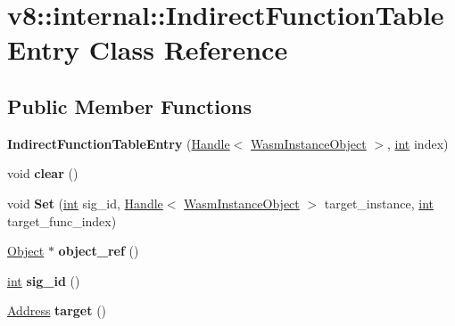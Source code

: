 \hypertarget{classv8_1_1internal_1_1IndirectFunctionTableEntry}{}\section{v8\+:\+:internal\+:\+:Indirect\+Function\+Table\+Entry Class Reference}
\label{classv8_1_1internal_1_1IndirectFunctionTableEntry}
\subsection*{Public Member Functions}
\begin{DoxyCompactItemize}
\item 
\mbox{\label{classv8_1_1internal_1_1IndirectFunctionTableEntry_aa31d066eb3cbeab5a5643d46a732711d}} 
{\bfseries Indirect\+Function\+Table\+Entry} (\mbox{\hyperlink{classv8_1_1internal_1_1Handle}{Handle}}$<$ \mbox{\hyperlink{classv8_1_1internal_1_1WasmInstanceObject}{Wasm\+Instance\+Object}} $>$, \mbox{\hyperlink{classint}{int}} index)
\item 
\mbox{\label{classv8_1_1internal_1_1IndirectFunctionTableEntry_a6b001921a06726cba7247d927be95c5b}} 
void {\bfseries clear} ()
\item 
\mbox{\label{classv8_1_1internal_1_1IndirectFunctionTableEntry_a9228066d6dac8c1a60000123a5586e0d}} 
void {\bfseries Set} (\mbox{\hyperlink{classint}{int}} sig\+\_\+id, \mbox{\hyperlink{classv8_1_1internal_1_1Handle}{Handle}}$<$ \mbox{\hyperlink{classv8_1_1internal_1_1WasmInstanceObject}{Wasm\+Instance\+Object}} $>$ target\+\_\+instance, \mbox{\hyperlink{classint}{int}} target\+\_\+func\+\_\+index)
\item 
\mbox{\label{classv8_1_1internal_1_1IndirectFunctionTableEntry_a686b397dae263368c95b2f990e7af810}} 
\mbox{\hyperlink{classv8_1_1internal_1_1Object}{Object}} $\ast$ {\bfseries object\+\_\+ref} ()
\item 
\mbox{\label{classv8_1_1internal_1_1IndirectFunctionTableEntry_a5fecf4e26fb6fd4e83eb6a4b24d5e6aa}} 
\mbox{\hyperlink{classint}{int}} {\bfseries sig\+\_\+id} ()
\item 
\mbox{\label{classv8_1_1internal_1_1IndirectFunctionTableEntry_a6aa0d1c4bb6480752f21c3923792460b}} 
\mbox{\hyperlink{classuintptr__t}{Address}} {\bfseries target} ()
\end{DoxyCompactItemize}


